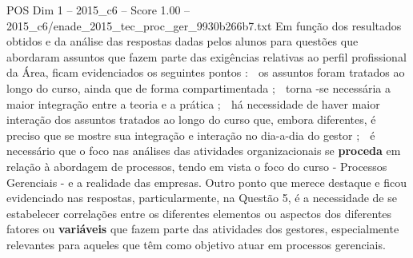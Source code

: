 \begin{textsample}{POS Dim 1 – 2015\_c6 – Score 1.00 – 2015\_c6/enade\_2015\_tec\_proc\_ger\_9930b266b7.txt}
Em função dos resultados obtidos e da análise das respostas dadas pelos alunos para questões que abordaram assuntos que fazem parte das exigências relativas ao perfil profissional da Área, ficam evidenciados os seguintes pontos :  os assuntos foram tratados ao longo do curso, ainda que de forma compartimentada ;  torna -se necessária a maior integração entre a teoria e a prática ;  há necessidade de haver maior interação dos assuntos tratados ao longo do curso que, embora diferentes, é preciso que se mostre sua integração e interação no dia-a-dia do gestor ;  é necessário que o foco nas análises das atividades organizacionais se \textbf{proceda} em relação à abordagem de processos, tendo em vista o foco do curso - Processos Gerenciais - e a realidade das empresas.
Outro ponto que merece destaque e ficou evidenciado nas respostas, particularmente, na Questão 5, é a necessidade de se estabelecer correlações entre os diferentes elementos ou aspectos dos diferentes fatores ou \textbf{variáveis} que fazem parte das atividades dos gestores, especialmente relevantes para aqueles que têm como objetivo atuar em processos gerenciais.

\end{textsample}
